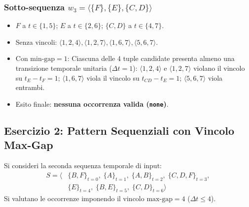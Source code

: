 \FloatBarrier
\subsubsection{Sotto-sequenza \texorpdfstring{$w_3 = \langle \{F\}, \{E\}, \{C, D\} \rangle$}{w3}}
\begin{itemize}
    \item $F$ a $t \in \{1, 5\}$; $E$ a $t \in \{2, 6\}$; $\{C, D\}$ a $t \in \{4, 7\}$.
    \item Senza vincoli: $\langle 1, 2, 4 \rangle, \langle 1, 2, 7 \rangle, \langle 1, 6, 7 \rangle, \langle 5, 6, 7 \rangle$.
    \item Con $\text{min-gap} = 1$:
    Ciascuna delle 4 tuple candidate presenta almeno una transizione temporale unitaria ($\Delta t = 1$):
    $\langle 1, 2, 4 \rangle$ e $\langle 1, 2, 7 \rangle$ violano il vincolo su $t_E - t_F = 1$; $\langle 1, 6, 7 \rangle$ viola il vincolo su $t_{CD} - t_E = 1$; $\langle 5, 6, 7 \rangle$ viola entrambi.
    \item Esito finale: \textbf{nessuna occorrenza valida (\texttt{none})}.
\end{itemize}

\FloatBarrier
\subsection{Esercizio 2: Pattern Sequenziali con Vincolo Max-Gap}
\label{sec:dm-seq-max-gap-exercise}

Si consideri la seconda sequenza temporale di input:
\begin{align}
S = \big\langle &\{B, F\}_{t=0}, \; \{A\}_{t=1}, \; \{A, B\}_{t=2}, \; \{C, D, F\}_{t=3}, \nonumber \\
&\{E\}_{t=4}, \; \{B, E\}_{t=5}, \; \{C, D\}_{t=6} \big\rangle
\end{align}
Si valutano le occorrenze imponendo il vincolo $\text{max-gap} = 4$ ($\Delta t \le 4$).

\FloatBarrier
